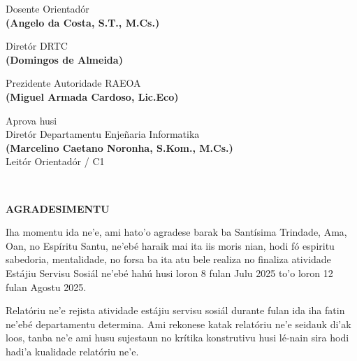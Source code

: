 \documentclass[12pt,a4paper]{article}
\begin{document}
\vspace{0.8cm}

\noindent
\begin{minipage}[t]{0.48\textwidth}
    \centering
    Dosente Orientadór \\[1.5cm]
    \textbf{(Angelo da Costa, S.T., M.Cs.)}
\end{minipage}
\hfill
\begin{minipage}[t]{0.48\textwidth}
    \centering
    Diretór DRTC \\[1.5cm]
    \textbf{(Domingos de Almeida)}
\end{minipage}

\vspace{0.8cm}

\begin{center}
    Prezidente Autoridade RAEOA \\[1.5cm]
    \textbf{(Miguel Armada Cardoso, Lic.Eco)}
\end{center}

\vspace{0.8cm}

\begin{center}
    Aprova husi \\[0.1cm]
    Diretór Departamentu Enjeñaria Informatika \\[1.5cm]
    \textbf{(Marcelino Caetano Noronha, S.Kom., M.Cs.)}\\[0.2cm]
    Leitór Orientadór / C1
\end{center}

\newpage
~

\newpage
\begin{center}
    \textbf{\Large AGRADESIMENTU}
\end{center}

\vspace{0.4cm}

Iha momentu ida ne’e, ami hato’o agradese barak ba Santísima Trindade, Ama, Oan, no Espíritu Santu, ne’ebé haraik mai ita iis moris nian, hodi fó espiritu sabedoria, mentalidade, no forsa ba ita atu bele realiza no finaliza atividade Estájiu Servisu Sosiál ne’ebé hahú husi loron 8 fulan Julu 2025 to’o loron 12 fulan Agostu 2025.

Relatóriu ne’e rejista atividade estájiu servisu sosiál durante fulan ida iha fatin ne’ebé departamentu determina. Ami rekonese katak relatóriu ne’e seidauk di’ak loos, tanba ne’e ami husu sujestaun no krítika konstrutivu husi lé-nain sira hodi hadi’a kualidade relatóriu ne’e.
\end{document}
